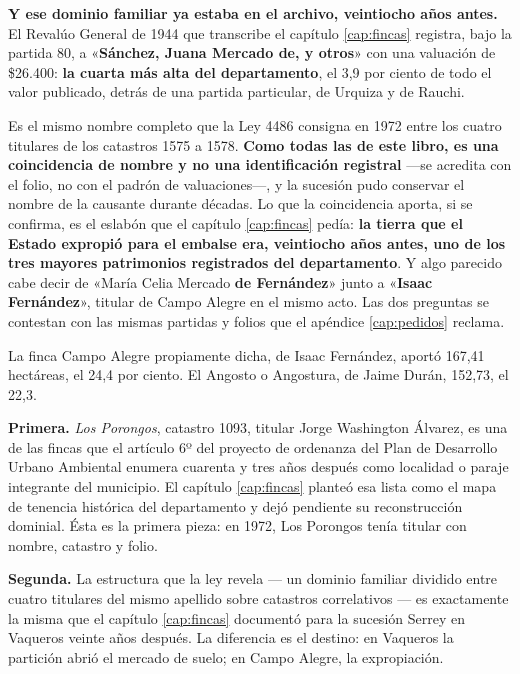 \begin{cautela}
\textbf{Y ese dominio familiar ya estaba en el archivo, veintiocho años antes.} El Revalúo General de 1944 que transcribe el capítulo \ref{cap:fincas} registra, bajo la partida 80, a «\textbf{Sánchez, Juana Mercado de, y otros}» con una valuación de \$26.400: \textbf{la cuarta más alta del departamento}, el 3,9 por ciento de todo el valor publicado, detrás de una partida particular, de Urquiza y de Rauchi.

Es el mismo nombre completo que la Ley 4486 consigna en 1972 entre los cuatro titulares de los catastros 1575 a 1578. \textbf{Como todas las de este libro, es una coincidencia de nombre y no una identificación registral} ---se acredita con el folio, no con el padrón de valuaciones---, y la sucesión pudo conservar el nombre de la causante durante décadas. Lo que la coincidencia aporta, si se confirma, es el eslabón que el capítulo \ref{cap:fincas} pedía: \textbf{la tierra que el Estado expropió para el embalse era, veintiocho años antes, uno de los tres mayores patrimonios registrados del departamento}. Y algo parecido cabe decir de «María Celia Mercado \textbf{de Fernández}» junto a «\textbf{Isaac Fernández}», titular de Campo Alegre en el mismo acto. Las dos preguntas se contestan con las mismas partidas y folios que el apéndice \ref{cap:pedidos} reclama.
\end{cautela}

La finca Campo Alegre propiamente dicha, de Isaac Fernández, aportó 167,41 hectáreas, el 24,4 por ciento. El Angosto o Angostura, de Jaime Durán, 152,73, el 22,3.

\textbf{Primera.} \textit{Los Porongos}, catastro 1093, titular Jorge Washington Álvarez, es una de las fincas que el artículo 6º del proyecto de ordenanza del Plan de Desarrollo Urbano Ambiental enumera cuarenta y tres años después como localidad o paraje integrante del municipio. El capítulo \ref{cap:fincas} planteó esa lista como el mapa de tenencia histórica del departamento y dejó pendiente su reconstrucción dominial. Ésta es la primera pieza: en 1972, Los Porongos tenía titular con nombre, catastro y folio.

\textbf{Segunda.} La estructura que la ley revela --- un dominio familiar dividido entre cuatro titulares del mismo apellido sobre catastros correlativos --- es exactamente la misma que el capítulo \ref{cap:fincas} documentó para la sucesión Serrey en Vaqueros veinte años después. La diferencia es el destino: en Vaqueros la partición abrió el mercado de suelo; en Campo Alegre, la expropiación.


